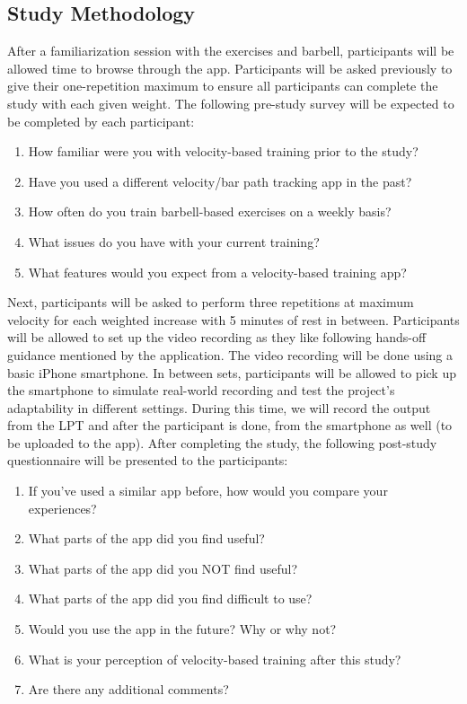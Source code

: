 \documentclass[10pt,twocolumn]{article}
\begin{document}
\subsection{Study Methodology}
After a familiarization session with the exercises and barbell, participants will be allowed time to browse through the app.
Participants will be asked previously to give their one-repetition maximum to ensure all participants can complete the study with each given weight.
The following pre-study survey will be expected to be completed by each participant:
\begin{enumerate}
  \item How familiar were you with velocity-based training prior to the study?
  \item Have you used a different velocity/bar path tracking app in the past?
  \item How often do you train barbell-based exercises on a weekly basis?
  \item What issues do you have with your current training?
  \item What features would you expect from a velocity-based training app?
\end{enumerate}\par

Next, participants will be asked to perform three repetitions at maximum velocity for each weighted increase with 5 minutes of rest in between.
Participants will be allowed to set up the video recording as they like following hands-off guidance mentioned by the application.
The video recording will be done using a basic iPhone smartphone.
In between sets, participants will be allowed to pick up the smartphone to simulate real-world recording and test the project's adaptability in different settings.
During this time, we will record the output from the LPT and after the participant is done, from the smartphone as well (to be uploaded to the app).
After completing the study, the following post-study questionnaire will be presented to the participants:
\begin{enumerate}
  \item If you've used a similar app before, how would you compare your experiences?
  \item What parts of the app did you find useful?
  \item What parts of the app did you NOT find useful?
  \item What parts of the app did you find difficult to use?
  \item Would you use the app in the future? Why or why not?
  \item What is your perception of velocity-based training after this study?
  \item Are there any additional comments?
\end{enumerate}
\end{document}
